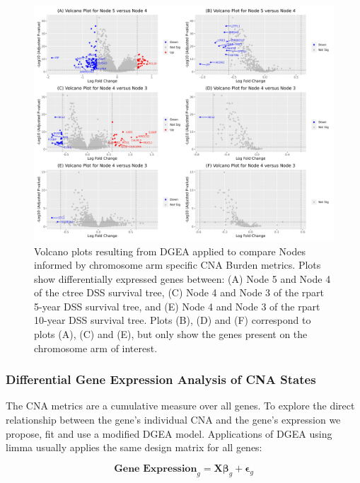 \vfill
\begin{figure}[H]
\includegraphics[width=1\linewidth]{../figures/Chapter_4/Volcano_Chr_Total.png}
\caption[Volcano plots resulting from DGEA applied to compare Nodes informed by chromosome arm specific CNA Burden metrics.]{Volcano plots resulting from DGEA applied to compare Nodes informed by chromosome arm specific CNA Burden metrics. Plots show differentially expressed genes between: (A) Node 5 and Node 4 of the ctree DSS survival tree, (C) Node 4 and Node 3 of the rpart 5-year DSS survival tree, and (E) Node 4 and Node 3 of the rpart 10-year DSS survival tree. Plots (B), (D) and (F) correspond to plots (A), (C) and (E), but only show the genes present on the chromosome arm of interest.}
\label{fig:Volcano_chr_total}
\end{figure}
\vfill

\subsubsection{Differential Gene Expression Analysis of CNA States}
The CNA metrics are a cumulative measure over all genes. To explore the direct relationship between the gene's individual CNA and the gene's expression we propose, fit and use a modified DGEA model. Applications of DGEA using limma usually applies the same design matrix for all genes:

$$\mathbf{\text{Gene Expression}}_{g} = \mathbf{X} \mathbf{\beta}_{g} + \mathbf{\epsilon}_{g}$$ 

